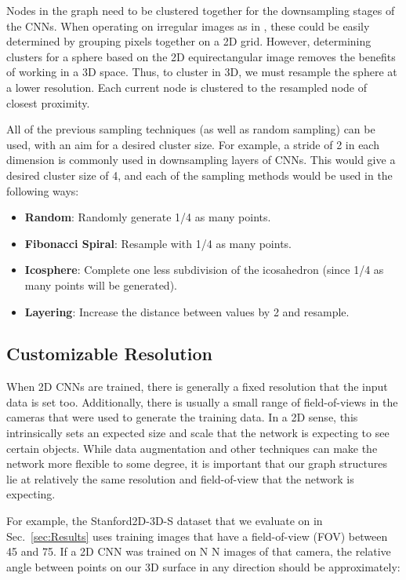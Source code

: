 \documentclass[10pt,twocolumn,letterpaper]{article}
\begin{document}
Nodes in the graph need to be clustered together for the downsampling stages of the CNNs. When operating on irregular images as in \cite{SelectionConv}, these could be easily determined by grouping pixels together on a 2D grid. However, determining clusters for a sphere based on the 2D equirectangular image removes the benefits of working in a 3D space. Thus, to cluster in 3D, we must resample the sphere at a lower resolution. Each current node is clustered to the resampled node of closest proximity. 

All of the previous sampling techniques (as well as random sampling) can be used, with an aim for a desired cluster size. For example, a stride of 2 in each dimension is commonly used in downsampling layers of CNNs. This would give a desired cluster size of 4, and each of the sampling methods would be used in the following ways:

\begin{itemize}
    \item \textbf{Random}: Randomly generate 1/4 as many points.
    \item \textbf{Fibonacci Spiral}: Resample with 1/4 as many points.
\item \textbf{Icosphere}: Complete one less subdivision of the icosahedron (since 1/4 as many points will be generated).
    \item \textbf{Layering}: Increase the distance between  values by 2 and resample.
\end{itemize}



\subsection{Customizable Resolution}

When 2D CNNs are trained, there is generally a fixed resolution that the input data is set too. Additionally, there is usually a small range of field-of-views in the cameras that were used to generate the training data. In a 2D sense, this intrinsically sets an expected size and scale that the network is expecting to see certain objects. While data augmentation and other techniques can make the network more flexible to some degree, it is important that our graph structures lie at relatively the same resolution and field-of-view that the network is expecting.

For example, the Stanford2D-3D-S dataset \cite{Armeni2017} that we evaluate on in Sec.~\ref{sec:Results} uses training images that have a field-of-view (FOV) between 45 and 75.
If a 2D CNN was trained on N  N images of that camera, the relative angle between points on our 3D surface in any direction should be approximately:
\end{document}
